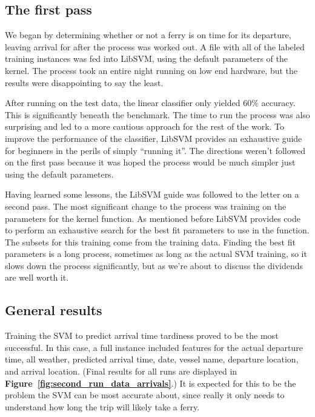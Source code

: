 \documentclass[11pt]{article} %
\begin{document}
\subsection{The first pass}
\label{sec:firstpass}
We began by determining whether or not a ferry is on
time for its departure, leaving arrival for after the process was worked out. 
A file with all of the labeled training instances was fed into LibSVM, using the
default parameters of the kernel. The process took an entire night running on
low end hardware, but the results were disappointing to say the least.

After running on the test data, the linear classifier only yielded $60\%$ accuracy. 
This is significantly beneath the benchmark. The time to run the process was also
surprising and led to a more cautious approach for the rest of the work. To 
improve the performance of the classifier, LibSVM provides an exhaustive guide 
\cite{changeLibSVM2011} for beginners in the perils of simply ``running it''. The 
directions weren't followed on the first pass because it was hoped the process 
would be much simpler just using the default parameters. 

Having learned some lessons, the LibSVM guide was followed to the letter on a 
second pass. The most significant change to the process was training on the 
parameters for the kernel function. As mentioned before LibSVM provides code
to perform an exhaustive search for the best fit parameters to use in the function.
The subsets for this training come from the training data. Finding the best fit 
parameters is a long process, sometimes as long as the actual SVM training, so it
slows down the process significantly, but as we're about to discuss the dividends 
are well worth it.
% 

\subsection{General results}
\label{sec:gen_results}
Training the SVM to predict arrival time tardiness proved to be the most successful.
In this case, a full instance included features for the actual departure time,
all weather, predicted arrival time, date, vessel name, departure location, and
arrival location. (Final results for all runs are displayed in 
\textbf{Figure~\ref{fig:second_run_data_arrivals}}.) It is expected for this to 
be the problem the SVM can be most accurate about, since really it only needs to 
understand how long the trip will likely take a ferry. 
\end{document}
